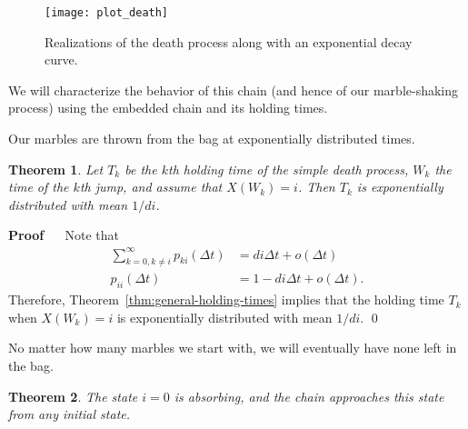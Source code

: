 \documentclass[12pt]{article}
\renewenvironment{proof}{%
\begin{adjustwidth}{\parindent}{\parindent}
{\bf Proof} \ \ 
}{\qed
\end{adjustwidth}}
\newtheorem{thm}{Theorem}[section]
\theoremstyle{definition}
\begin{document}
\begin{figure}[h]
    \centering
    \texttt{[image: plot\_death]}
    \caption{Realizations of the death process along with an exponential decay
    curve.}
    \label{fig:plot_death}
\end{figure}

We will characterize the behavior of this chain (and hence of our
marble-shaking process) using the embedded chain and its holding times.

Our marbles are thrown from the bag at exponentially distributed times.

\begin{thm}
    \label{thm:holding-time}
    Let $T_k$ be the $k$th holding time of the simple death process, $W_k$ the
    time of the $k$th jump, and assume that $X(W_k) = i$. Then $T_k$ is
    exponentially distributed with mean $1/di$.
\end{thm}

\begin{proof}
Note that
\begin{align*}
    \sum_{k = 0, k \neq i}^\infty p_{ki}(\Delta t)
        &= di \Delta t + o(\Delta t) \\
    p_{ii}(\Delta t) &= 1 - di \Delta t + o(\Delta t).
\end{align*}
Therefore, Theorem~\ref{thm:general-holding-times} implies that the holding
time $T_k$ when $X(W_k) = i$ is exponentially distributed with mean $1/di$.
\end{proof}

No matter how many marbles we start with, we will eventually have none left in
the bag.

\begin{thm}
    \label{thm:limit-behavior}
    The state $i = 0$ is absorbing, and the chain approaches this state from
    any initial state.
\end{thm}
\end{document}
